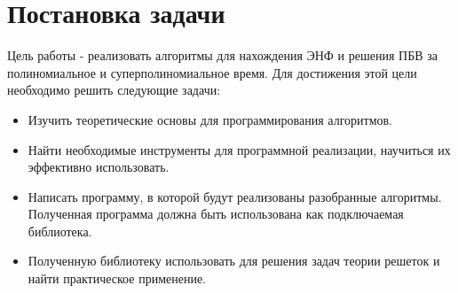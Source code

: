 \newpage

\section{Постановка задачи}

Цель работы - реализовать алгоритмы для нахождения ЭНФ и решения ПБВ за полиномиальное и суперполиномиальное время. Для достижения этой цели необходимо решить следующие задачи:
\begin{itemize}
\item Изучить теоретические основы для программирования алгоритмов.
\item Найти необходимые инструменты для программной реализации, научиться их эффективно использовать.
\item Написать программу, в которой будут реализованы разобранные алгоритмы. Полученная программа должна быть использована как подключаемая библиотека.
\item Полученную библиотеку использовать для решения задач теории решеток и найти практическое применение.
\end{itemize}  

\clearpage